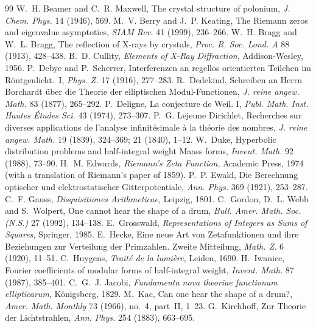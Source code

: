 \documentclass[11pt]{article}
\begin{document}
\begin{thebibliography}{99}\small
{} W.~H. Beamer and C.~R. Maxwell, The crystal structure of polonium, \emph{J. Chem. Phys.} 14 (1946), 569.
 M.~V. Berry and J.~P. Keating, The Riemann zeros and eigenvalue asymptotics, \emph{SIAM Rev.} 41 (1999), 236--266.
 W.~H. Bragg and W.~L. Bragg, The reflection of X-rays by crystals, \emph{Proc. R. Soc. Lond. A} 88 (1913), 428--438.
 B.~D. Cullity, \emph{Elements of X-Ray Diffraction}, Addison-Wesley, 1956.
 P.~Debye and P.~Scherrer, Interferenzen an regellos orientierten Teilchen im R\"ontgenlicht.~I, \emph{Phys. Z.} 17 (1916), 277--283.
 R.~Dedekind, Schreiben an Herrn Borchardt \"uber die Theorie der elliptischen Modul-Functionen, \emph{J. reine angew. Math.} 83 (1877), 265--292.
 P.~Deligne, La conjecture de Weil. I, \emph{Publ. Math. Inst. Hautes \'Etudes Sci.} 43 (1974), 273--307.
 P.~G. Lejeune Dirichlet, Recherches sur diverses applications de l'analyse infinit\'esimale \`a la th\'eorie des nombres, \emph{J. reine angew. Math.} 19 (1839), 324--369; 21 (1840), 1--12.
 W.~Duke, Hyperbolic distribution problems and half-integral weight Maass forms, \emph{Invent. Math.} 92 (1988), 73--90.
 H.~M. Edwards, \emph{Riemann's Zeta Function}, Academic Press, 1974 (with a translation of Riemann's paper of 1859).
 P.~P. Ewald, Die Berechnung optischer und elektrostatischer Gitterpotentiale, \emph{Ann. Phys.} 369 (1921), 253--287.
 C.~F. Gauss, \emph{Disquisitiones Arithmeticae}, Leipzig, 1801.
 C.~Gordon, D.~L. Webb and S.~Wolpert, One cannot hear the shape of a drum, \emph{Bull. Amer. Math. Soc. (N.S.)} 27 (1992), 134--138.
 E.~Grosswald, \emph{Representations of Integers as Sums of Squares}, Springer, 1985.
 E.~Hecke, Eine neue Art von Zetafunktionen und ihre Beziehungen zur Verteilung der Primzahlen. Zweite Mitteilung, \emph{Math. Z.} 6 (1920), 11--51.
 C.~Huygens, \emph{Trait\'e de la lumi\`ere}, Leiden, 1690.
 H.~Iwaniec, Fourier coefficients of modular forms of half-integral weight, \emph{Invent. Math.} 87 (1987), 385--401.
 C.~G.~J. Jacobi, \emph{Fundamenta nova theoriae functionum ellipticarum}, K\"onigsberg, 1829.
 M.~Kac, Can one hear the shape of a drum?, \emph{Amer. Math. Monthly} 73 (1966), no.~4, part~II, 1--23.
 G.~Kirchhoff, Zur Theorie der Lichtstrahlen, \emph{Ann. Phys.} 254 (1883), 663--695.

\end{thebibliography}
\end{document}
